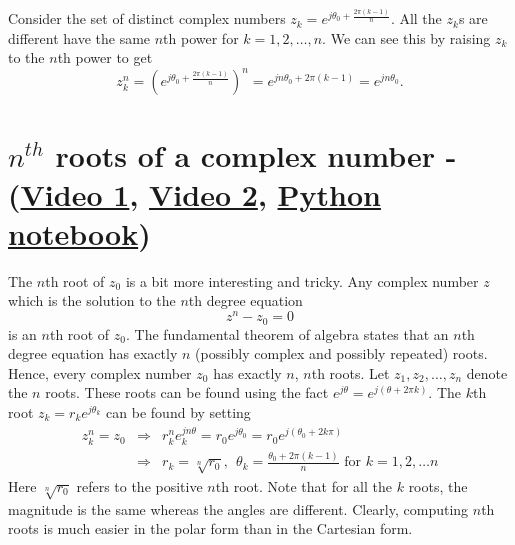 Consider the set of distinct complex numbers $z_k = e^{j \theta_0 + \frac{2 \pi (k-1)}{n}}$. All the $z_k$s are different have the same $n$th power for $k=1,2,\ldots,n$. We can see this by raising $z_k$ to the $n$th power to get
\begin{equation}
z_k^n = \left(e^{j \theta_0 + \frac{2 \pi (k-1)}{n}}\right)^n = e^{j n \theta_0 + 2 \pi (k-1)} = e^{j n \theta_0}.
\end{equation}

\section{$n^{th}$ roots of a complex number -
(\href{https://youtu.be/MOudd6zG72Q}{Video 1},
\href{https://youtu.be/DKW7Fkvb4JA}{Video 2},
\href{https://colab.research.google.com/drive/1SQh4WxEiAz03-S8pS9OXiNRmV2Go5bRh?usp=sharing}{Python notebook})}
\label{sec:nthroots}
The $n$th root of $z_0$ is a bit more interesting and tricky. Any complex number $z$ which is the solution to the $n$th degree equation
\[
z^n - z_0 = 0
\]
is an $n$th root of $z_0$. The fundamental theorem of algebra states that an $n$th degree equation has exactly $n$ (possibly complex and possibly repeated) roots. Hence, every complex number $z_0$ has exactly $n$, $n$th roots.  Let $z_1,z_2,\ldots,z_n$ denote the $n$ roots.
These roots can be found using
the fact $e^{j \theta} = e^{j (\theta + 2 \pi k)}$.
The $k$th root $z_k = r_k e^{j \theta_k}$ can be found by setting
\begin{eqnarray}
\nonumber
z_k^n = z_0 & \Rightarrow & r_k^n e_k^{jn\theta} = r_0 e^{j\theta_0} = r_0 e^{j(\theta_0 +2 k \pi)} \\
\label{eq:nthroot}
& \Rightarrow & r_k = \sqrt[n]{r_0}, \ \ \theta_k = \frac{\theta_0+2 \pi (k-1)}{n} \mbox{ for } k = 1,2,\ldots n
\end{eqnarray}
Here $\sqrt[n]{r_0}$ refers to the positive $n$th root.
Note that for all the $k$ roots, the magnitude is the same whereas the angles are different.
Clearly, computing $n$th roots is much easier in the polar form than in the Cartesian form.

